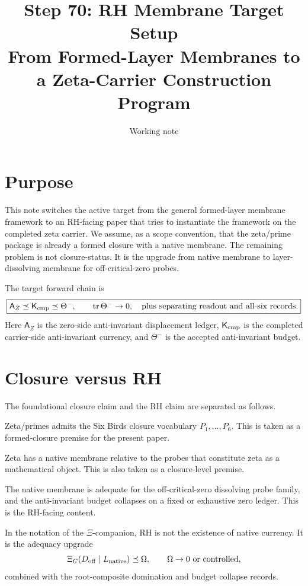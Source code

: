 \documentclass[11pt]{article}
\title{Step 70: RH Membrane Target Setup\\From Formed-Layer Membranes to a Zeta-Carrier Construction Program}
\author{Working note}
\date{}
\newcommand{\AZ}{\mathsf A_Z}
\newcommand{\Kcmp}{\mathsf K_{\rm cmp}}
\newcommand{\ThetaMinus}{\Theta^-}
\begin{document}
\maketitle

\section{Purpose}
This note switches the active target from the general formed-layer membrane framework to an RH-facing paper that tries to instantiate the framework on the completed zeta carrier.  We assume, as a scope convention, that the zeta/prime package is already a formed closure with a native membrane.  The remaining problem is not closure-status.  It is the upgrade from native membrane to layer-dissolving membrane for off-critical-zero probes.

The target forward chain is
\[
\boxed{
\AZ\preceq \Kcmp\preceq \ThetaMinus,
\qquad \operatorname{tr}\ThetaMinus\to0,
\quad \text{plus separating readout and all-six records.}
}
\]
Here \(\AZ\) is the zero-side anti-invariant displacement ledger, \(\Kcmp\) is the completed carrier-side anti-invariant currency, and \(\ThetaMinus\) is the accepted anti-invariant budget.

\section{Closure versus RH}
The foundational closure claim and the RH claim are separated as follows.

\begin{description}[leftmargin=2.2cm]
\item[Claim A.] Zeta/primes admits the Six Birds closure vocabulary \(P_1,\dots,P_6\).  This is taken as a formed-closure premise for the present paper.
\item[Claim A'.] Zeta has a native membrane relative to the probes that constitute zeta as a mathematical object.  This is also taken as a closure-level premise.
\item[Claim B.] The native membrane is adequate for the off-critical-zero dissolving probe family, and the anti-invariant budget collapses on a fixed or exhaustive zero ledger.  This is the RH-facing content.
\end{description}

In the notation of the \(\Xi\)-companion, RH is not the existence of native currency.  It is the adequacy upgrade
\[
\Xi_{C}(D_{\rm off}\mid L_{\rm native})\preceq \Omega,
\qquad \Omega\to0\text{ or controlled,}
\]
combined with the root-composite domination and budget collapse records.
\end{document}
